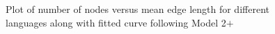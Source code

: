 \documentclass[a4paper]{article}
\begin{document}
\begin{figure}[hbtp]
	\centering
	\quad
	\caption{Plot of number of nodes versus mean edge length for different languages along with fitted curve following Model 2$+$}	
\end{figure}
\end{document}

